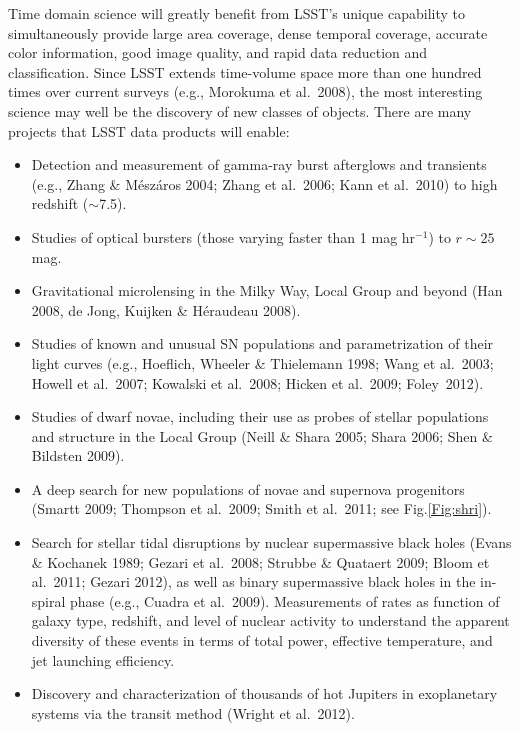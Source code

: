 \documentclass{emulateapj}
\begin{document}
Time domain science will greatly benefit from LSST's unique capability to simultaneously
provide large area coverage, dense temporal coverage, accurate color information,
good image quality, and rapid data reduction and classification. Since LSST extends 
time-volume space more than one hundred times over current surveys (e.g., Morokuma et al.~2008), 
the most interesting science may well be the discovery of new classes of objects.  
There are many projects that LSST data products will enable:

\begin{itemize}
\item Detection and measurement of gamma-ray burst afterglows and transients 
      (e.g., Zhang \& M\'{e}sz\'{a}ros 2004; Zhang et al.~2006; Kann et al.~2010) to high redshift ($\sim$7.5).
  \item Studies of optical bursters (those varying faster than 1 mag hr$^{-1}$) to $r\sim25$ mag. 
\item Gravitational microlensing in the Milky Way, Local Group and beyond (Han 2008, de Jong, Kuijken \& H\'{e}raudeau 2008).
\item Studies of known and unusual SN populations and parametrization of their light curves 
         (e.g., Hoeflich, Wheeler \& Thielemann 1998; Wang et al.~2003; Howell et al.~2007;
          Kowalski et al.~2008; Hicken et al.~2009; Foley~2012).
\item Studies of dwarf novae, including their use as probes of stellar populations and 
      structure in the Local Group (Neill \& Shara 2005; Shara 2006; Shen \& Bildsten 2009).
\item A deep search for new populations of novae and supernova progenitors 
      (Smartt 2009; Thompson et al.~2009; Smith et al.~2011; see Fig.\ref{Fig:shri}). 
\item Search for stellar tidal disruptions by nuclear supermassive black
       holes (Evans \& Kochanek 1989; Gezari et al.~2008; Strubbe \& Quataert 2009; Bloom et al.~2011; Gezari 2012), 
       as well as binary supermassive black holes in the in-spiral phase (e.g., Cuadra et al.~2009).
       Measurements of rates as function of galaxy type, redshift, and level of nuclear activity
       to understand the apparent diversity of these events in terms of  total power, effective temperature, 
       and jet launching efficiency. 
\item Discovery and characterization of thousands of hot Jupiters 
  in exoplanetary systems via the transit method (Wright et al.~2012). 

\end{itemize}
\end{document}
